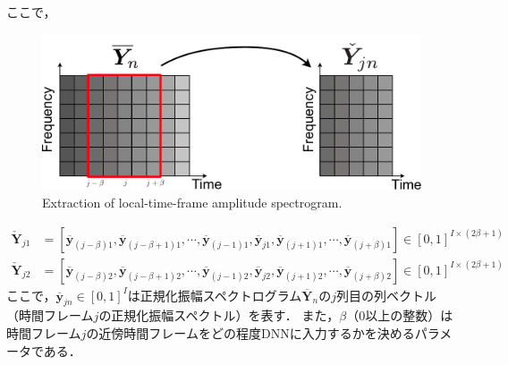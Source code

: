 ここで，
\begin{figure}[t]
    \begin{center}
        \includegraphics[width=0.95\columnwidth]{figures/make_minispec.pdf}
    \end{center}
    \vspace{-8pt}
	\caption{Extraction of local-time-frame amplitude spectrogram.}
	\label{fig:make_minispec}
\end{figure}
\begin{align}
    \check{\bm{Y}}_{j1} &= [ \overline{\bm{y}}_{(j-\beta)1}, \overline{\bm{y}}_{(j-\beta+1)1}, \cdots, \overline{\bm{y}}_{(j-1)1}, \overline{\bm{y}}_{j1}, \overline{\bm{y}}_{(j+1)1}, \cdots, \overline{\bm{y}}_{(j+\beta)1}  ] \in [ 0, 1 ]^{I\times (2\beta+1)} \label{eq:y_check1}\\
    \check{\bm{Y}}_{j2} &= [ \overline{\bm{y}}_{(j-\beta)2}, \overline{\bm{y}}_{(j-\beta+1)2}, \cdots, \overline{\bm{y}}_{(j-1)2}, \overline{\bm{y}}_{j2}, \overline{\bm{y}}_{(j+1)2}, \cdots, \overline{\bm{y}}_{(j+\beta)2}  ] \in [ 0, 1 ]^{I\times (2\beta+1)} \label{eq:y_check2}
\end{align}
ここで，$\overline{\bm{y}}_{jn}\in [0,1]^{I}$は正規化振幅スペクトログラム$\overline{\bm{Y}}_n$の$j$列目の列ベクトル（時間フレーム$j$の正規化振幅スペクトル）を表す．
また，$\beta$（0以上の整数）は時間フレーム$j$の近傍時間フレームをどの程度DNNに入力するかを決めるパラメータである．
